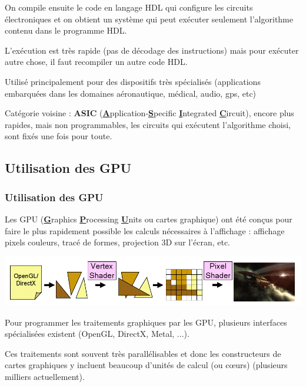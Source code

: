 \documentclass[usenames,dvipsnames]{beamer}
\begin{document}
\begin{frame}
On compile ensuite le code en langage HDL qui configure les circuits électroniques et on obtient un système qui peut exécuter seulement l'algorithme contenu dans le programme HDL.

\vfill

L'exécution est très rapide (pas de décodage des instructions) mais pour exécuter autre chose, il faut recompiler un autre code HDL.

\vfill

Utilisé principalement pour des dispositifs très spécialisés (applications embarquées dans les domaines aéronautique, médical,  audio, gps, etc)

\vfill

Catégorie voisine : {\bfseries ASIC} (\underline{\bfseries A}pplication-\underline{\bfseries S}pecific \underline{\bfseries I}ntegrated \underline{\bfseries C}ircuit), encore plus rapides, mais non programmables, les circuits qui exécutent l'algorithme choisi, sont fixés une fois pour toute.
	
\end{frame}

\begin{frame}
\section{Utilisation des GPU}
\frametitle{Utilisation des GPU}

Les GPU (\underline{\bfseries G}raphics \underline{\bfseries P}rocessing \underline{\bfseries U}nits ou cartes graphique) ont été conçus pour faire le plus rapidement possible les calculs nécessaires à l'affichage : affichage pixels couleurs, tracé de formes, projection 3D sur l'écran, etc.
\vfill

\begin{center}
\includegraphics[scale=1.2]{../../Images/GPU_image}
\end{center}

\vfill
Pour programmer les traitements graphiques par les GPU, plusieurs interfaces spécialisées existent (OpenGL, DirectX, Metal, ...).

\vfill

Ces traitements sont souvent très parallélisables et donc les constructeurs de cartes graphiques y incluent beaucoup d'unités de calcul (ou c\oe urs) (plusieurs milliers actuellement).
\vfill

\end{frame}
\end{document}
